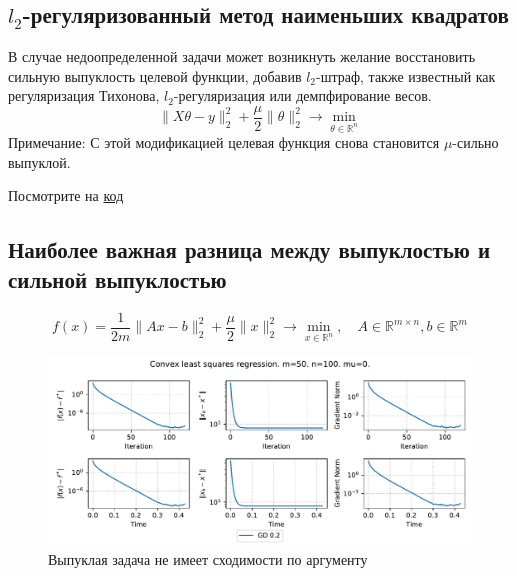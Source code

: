 \documentclass[
  russian,
  letterpaper,
  DIV=11,
  numbers=noendperiod]{scrartcl}
\begin{document}
\subsection{\texorpdfstring{\(l_2\)-регуляризованный метод наименьших
квадратов}{l\_2-регуляризованный метод наименьших квадратов}}\label{l_2-ux440ux435ux433ux443ux43bux44fux440ux438ux437ux43eux432ux430ux43dux43dux44bux439-ux43cux435ux442ux43eux434-ux43dux430ux438ux43cux435ux43dux44cux448ux438ux445-ux43aux432ux430ux434ux440ux430ux442ux43eux432}

В случае недоопределенной задачи может возникнуть желание восстановить
сильную выпуклость целевой функции, добавив \(l_2\)-штраф, также
известный как регуляризация Тихонова, \(l_2\)-регуляризация или
демпфирование весов. \[
\|X \theta - y\|^2_2 + \dfrac{\mu}{2} \|\theta\|^2_2\to \min_{\theta \in \mathbb{R}^{n}}
\] Примечание: С этой модификацией целевая функция снова становится
\(\mu\)-сильно выпуклой.

Посмотрите на
\href{https://colab.research.google.com/github/MerkulovDaniil/optim/blob/master/assets/Notebooks/l2_LLS.ipynb}{\faPython код}

\subsection{Наиболее важная разница между выпуклостью и сильной
выпуклостью}\label{ux43dux430ux438ux431ux43eux43bux435ux435-ux432ux430ux436ux43dux430ux44f-ux440ux430ux437ux43dux438ux446ux430-ux43cux435ux436ux434ux443-ux432ux44bux43fux443ux43aux43bux43eux441ux442ux44cux44e-ux438-ux441ux438ux43bux44cux43dux43eux439-ux432ux44bux43fux443ux43aux43bux43eux441ux442ux44cux44e}

\[
f(x) = \frac{1}{2m}\|A x - b\|^2_2 + \dfrac{\mu}{2} \|x\|^2_2\to \min_{x \in \mathbb{R}^{n}}, \quad A \in \mathbb{R}^{m \times n}, b \in \mathbb{R}^m
\]

\begin{figure}[H]

{\centering \includegraphics[width=0.85\linewidth,height=\textheight,keepaspectratio]{lls_convex.pdf}

}

\caption{Выпуклая задача не имеет сходимости по аргументу}

\end{figure}%
\end{document}
